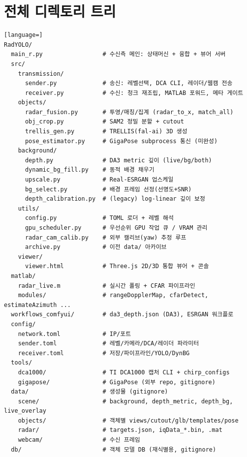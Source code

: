 \chapter{전체 디렉토리 트리}
\begin{lstlisting}[language=]
RadYOLO/
  main_r.py                 # 수신측 메인: 상태머신 + 융합 + 뷰어 서버
  src/
    transmission/
      sender.py             # 송신: 레벨선택, DCA CLI, 레이더/웹캠 전송
      receiver.py           # 수신: 청크 재조립, MATLAB 포워드, 메타 게이트
    objects/
      radar_fusion.py       # 투영/매칭/집계 (radar_to_x, match_all)
      obj_crop.py           # SAM2 정밀 분할 + cutout
      trellis_gen.py        # TRELLIS(fal-ai) 3D 생성
      pose_estimator.py     # GigaPose subprocess 통신 (미완성)
    background/
      depth.py              # DA3 metric 깊이 (live/bg/both)
      dynamic_bg_fill.py    # 동적 배경 채우기
      upscale.py            # Real-ESRGAN 업스케일
      bg_select.py          # 배경 프레임 선정(선명도+SNR)
      depth_calibration.py  # (legacy) log-linear 깊이 보정
    utils/
      config.py             # TOML 로더 + 레벨 해석
      gpu_scheduler.py      # 우선순위 GPU 작업 큐 / VRAM 관리
      radar_cam_calib.py    # 외부 캘리브(yaw) 추정 루프
      archive.py            # 이전 data/ 아카이브
    viewer/
      viewer.html           # Three.js 2D/3D 통합 뷰어 + 콘솔
  matlab/
    radar_live.m            # 실시간 폴링 + CFAR 파이프라인
    modules/                # rangeDopplerMap, cfarDetect, estimateAzimuth ...
  workflows_comfyui/        # da3_depth.json (DA3), ESRGAN 워크플로
  config/
    network.toml            # IP/포트
    sender.toml             # 레벨/카메라/DCA/레이더 파라미터
    receiver.toml           # 저장/파이프라인/YOLO/DynBG
  tools/
    dca1000/                # TI DCA1000 캡처 CLI + chirp_configs
    gigapose/               # GigaPose (외부 repo, gitignore)
  data/                     # 생성물 (gitignore)
    scene/                  # background, depth_metric, depth_bg, live_overlay
    objects/                # 객체별 views/cutout/glb/templates/pose
    radar/                  # targets.json, iqData_*.bin, .mat
    webcam/                 # 수신 프레임
  db/                       # 객체 모델 DB (재식별용, gitignore)
\end{lstlisting}

